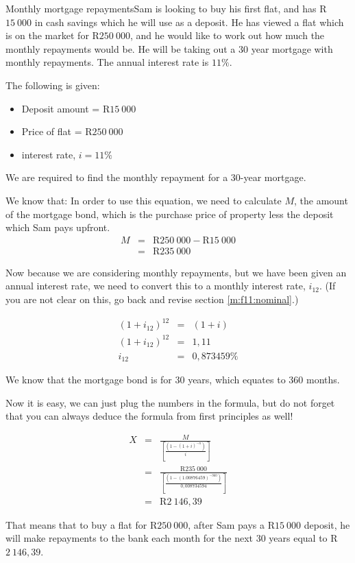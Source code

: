 \begin{wex}{Monthly mortgage repayments}{Sam is looking to buy his first flat, and has R$15~000$ in cash savings which he will use as a deposit. He has viewed a flat which is on the market for R$250~000$, and he would like to work out how much the monthly repayments would be. He will be taking out a 30 year mortgage with monthly repayments. The annual interest rate is $11\%$.}
{
The following is given:
\begin{itemize}
\item{Deposit amount = R$15~000$}
\item{Price of flat = R$250~000$}
\item{interest rate, $i=11\%$}
\end{itemize}
We are required to find the monthly repayment for a 30-year mortgage.

We know that:
In order to use this equation, we need to calculate $M$, the amount of the mortgage bond, which is the purchase price of property less the deposit which Sam pays upfront.
\begin{eqnarray*}
M &=& \mbox{R}250~000 - \mbox{R}15~000\\
&=& \mbox{R}235~000
\end{eqnarray*}

Now because we are considering monthly repayments, but we have been given an annual interest rate, we need to convert this to a monthly interest rate, $i_{12}$. (If you are not clear on this, go back and revise section \ref{m:f11:nominal}.)

\begin{eqnarray*}
(1+ i_{12})^{12} &=& (1+i)\\
(1 + i_{12})^{12} &=& 1,11\\
i_{12} &=& 0,873459\%
\end{eqnarray*}

We know that the mortgage bond is for 30 years, which equates to 360 months.

Now it is easy, we can just plug the numbers in the formula, but do not forget that you can always deduce the formula from first principles as well!

\begin{eqnarray*}
X &=& \frac{M}{[\frac{(1-(1+i)^{-n})}{i}]}\\
&=& \frac{\mbox{R}235~000}{[\frac{(1-(1.00876459)^{-360})}{0,008734594}]}\\
&=& \mbox{R}2~146,39
\end{eqnarray*}

That means that to buy a flat for R$250~000$, after Sam pays a R$15~000$ deposit, he will make repayments to the bank each month for the next 30 years equal to R$2~146,39$.}
\end{wex}

